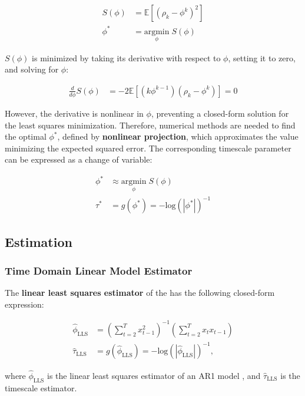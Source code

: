 \documentclass[main.tex]{subfiles}
\begin{document}
\begin{align}
    S(\phi) &= \mathbb{E}[(\rho_k - \phi^k)^2]\\
    \phi^* &= \underset{\phi}{\text{argmin}} \; S(\phi)
\end{align}

\noindent $S(\phi)$ is minimized by taking its derivative with respect to $\phi$, setting it to zero, and solving for $\phi$:

\begin{align}
    \frac{d}{d\phi} S(\phi) &= -2\mathbb{E}[(k\phi^{k-1})(\rho_k - \phi^k)] = 0
\end{align}

\noindent However, the derivative is nonlinear in $\phi$, preventing a closed-form solution for the least squares minimization. Therefore, numerical methods are needed to find the optimal $\phi^*$, defined by \textbf{nonlinear projection}, which approximates the value minimizing the expected squared error. The corresponding timescale parameter can be expressed as a change of variable:

\begin{align}
    \phi^* &\approx \underset{\phi}{\text{argmin}} \; S(\phi) \label{eq:nlm-phi}\\
    \tau^* &= g(\phi^*) = -{\text{log}(|\phi^*|)}^{-1} \label{eq:ar1-tau}
\end{align}

\subsection{Estimation}
\subsubsection{Time Domain Linear Model Estimator}
The \textbf{linear least squares estimator} of the  has the following closed-form expression:

\begin{align}
    \hat\phi_{\scriptscriptstyle\text{LLS}} &= (\sum_{t=2}^T x_{t-1}^2)^{-1} (\sum_{t=2}^T x_t x_{t-1})\\
    \hat\tau_{\scriptscriptstyle\text{LLS}} &= g(\hat\phi_{\scriptscriptstyle\text{LLS}}) = - {\text{log}(|\hat\phi_{\scriptscriptstyle\text{LLS}}|)}^{-1},
\end{align}

\noindent where $\hat\phi_{\scriptscriptstyle\text{LLS}}$ is the linear least squares estimator of an AR1 model \citep[chapter~14.3]{hansen_econometrics_2022}, and $\hat\tau_{\scriptscriptstyle\text{LLS}}$ is the timescale estimator.\\
\end{document}
